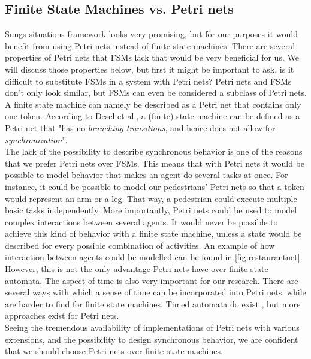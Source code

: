 \documentclass[11pt, a4paper]{book}
\begin{document}
\subsection{Finite State Machines vs. Petri nets}
Sungs situations framework looks very promising, but for our purposes it would benefit from using Petri nets instead of finite state machines. There are several properties of Petri nets that FSMs lack that would be very beneficial for us. We will discuss those properties below, but first it might be important to ask, is it difficult to substitute FSMs in a system with Petri nets? Petri nets and FSMs don't only look similar, but FSMs can even be considered a subclass of Petri nets. A finite state machine can namely be described as a Petri net that contains only one token. According to Desel et al., a (finite) state machine can be defined as a Petri net that "has no \emph{branching transitions}, and hence does not allow for \emph{synchronization}".\\
The lack of the possibility to describe synchronous behavior is one of the reasons that we prefer Petri nets over FSMs. This means that with Petri nets it would be possible to model behavior that makes an agent do several tasks at once. For instance, it could be possible to model our pedestrians' Petri nets so that a token would represent an arm or a leg. That way, a pedestrian could execute multiple basic tasks independently. More importantly, Petri nets could be used to model complex interactions between several agents. It would never be possible to achieve this kind of behavior with a finite state machine, unless a state would be described for every possible combination of activities.  An example of how interaction between agents could be modelled can be found in \ref{fig:restaurantnet}.\\
However, this is not the only advantage Petri nets have over finite state automata. The aspect of time is also very important for our research. There are several ways with which a sense of time can be incorporated into Petri nets, while are harder to find for finite state machines. Timed automata do exist \cite{alur1994theory}, but more approaches exist for Petri nets.\\
Seeing the tremendous availability of implementations of Petri nets with various extensions, and the possibility to design synchronous behavior, we are confident that we should choose Petri nets over finite state machines.
\end{document}
